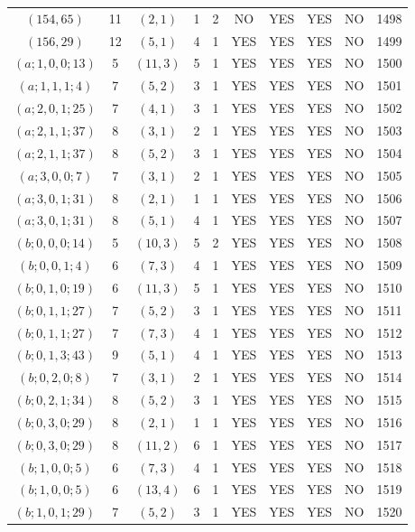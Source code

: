 \begin{longtable}{|c|c|c|c|c|c|c|c|c|c|}
$(154, 65)$ & 11 & $(2, 1)$ & 1 & 2 & NO & YES & YES & NO & 1498\\
$(156, 29)$ & 12 & $(5, 1)$ & 4 & 1 & YES & YES & YES & NO & 1499\\
$(a; 1, 0, 0; 13)$ & 5 & $(11, 3)$ & 5 & 1 & YES & YES & YES & NO & 1500\\
$(a; 1, 1, 1; 4)$ & 7 & $(5, 2)$ & 3 & 1 & YES & YES & YES & NO & 1501\\
$(a; 2, 0, 1; 25)$ & 7 & $(4, 1)$ & 3 & 1 & YES & YES & YES & NO & 1502\\
$(a; 2, 1, 1; 37)$ & 8 & $(3, 1)$ & 2 & 1 & YES & YES & YES & NO & 1503\\
$(a; 2, 1, 1; 37)$ & 8 & $(5, 2)$ & 3 & 1 & YES & YES & YES & NO & 1504\\
$(a; 3, 0, 0; 7)$ & 7 & $(3, 1)$ & 2 & 1 & YES & YES & YES & NO & 1505\\
$(a; 3, 0, 1; 31)$ & 8 & $(2, 1)$ & 1 & 1 & YES & YES & YES & NO & 1506\\
$(a; 3, 0, 1; 31)$ & 8 & $(5, 1)$ & 4 & 1 & YES & YES & YES & NO & 1507\\
$(b; 0, 0, 0; 14)$ & 5 & $(10, 3)$ & 5 & 2 & YES & YES & YES & NO & 1508\\
$(b; 0, 0, 1; 4)$ & 6 & $(7, 3)$ & 4 & 1 & YES & YES & YES & NO & 1509\\
$(b; 0, 1, 0; 19)$ & 6 & $(11, 3)$ & 5 & 1 & YES & YES & YES & NO & 1510\\
$(b; 0, 1, 1; 27)$ & 7 & $(5, 2)$ & 3 & 1 & YES & YES & YES & NO & 1511\\
$(b; 0, 1, 1; 27)$ & 7 & $(7, 3)$ & 4 & 1 & YES & YES & YES & NO & 1512\\
$(b; 0, 1, 3; 43)$ & 9 & $(5, 1)$ & 4 & 1 & YES & YES & YES & NO & 1513\\
$(b; 0, 2, 0; 8)$ & 7 & $(3, 1)$ & 2 & 1 & YES & YES & YES & NO & 1514\\
$(b; 0, 2, 1; 34)$ & 8 & $(5, 2)$ & 3 & 1 & YES & YES & YES & NO & 1515\\
$(b; 0, 3, 0; 29)$ & 8 & $(2, 1)$ & 1 & 1 & YES & YES & YES & NO & 1516\\
$(b; 0, 3, 0; 29)$ & 8 & $(11, 2)$ & 6 & 1 & YES & YES & YES & NO & 1517\\
$(b; 1, 0, 0; 5)$ & 6 & $(7, 3)$ & 4 & 1 & YES & YES & YES & NO & 1518\\
$(b; 1, 0, 0; 5)$ & 6 & $(13, 4)$ & 6 & 1 & YES & YES & YES & NO & 1519\\
$(b; 1, 0, 1; 29)$ & 7 & $(5, 2)$ & 3 & 1 & YES & YES & YES & NO & 1520\\

\end{longtable}
